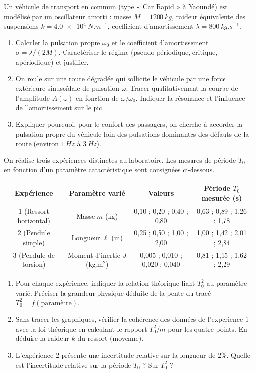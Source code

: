 \documentclass[11pt]{article}
\begin{document}
\begin{exercice}
Un véhicule de transport en commun (type « Car Rapid » à Yaoundé) est modélisé par un oscillateur amorti : masse $M = \SI{1200}{kg}$, raideur équivalente des suspensions $k = \SI{4.0e4}{N.m^{-1}}$, coefficient d'amortissement $\lambda = \SI{800}{kg.s^{-1}}$.
\begin{enumerate}
    \item Calculer la pulsation propre $\omega_0$ et le coefficient d'amortissement $\sigma = \lambda/(2M)$. Caractériser le régime (pseudo-périodique, critique, apériodique) et justifier.
    \item On roule sur une route dégradée qui sollicite le véhicule par une force extérieure sinusoïdale de pulsation $\omega$. Tracer qualitativement la courbe de l'amplitude $A(\omega)$ en fonction de $\omega/\omega_0$. Indiquer la résonance et l'influence de l'amortissement sur le pic.
    \item Expliquer pourquoi, pour le confort des passagers, on cherche à accorder la pulsation propre du véhicule loin des pulsations dominantes des défauts de la route (environ $\SI{1}{Hz}$ à $\SI{3}{Hz}$).
\end{enumerate}
\end{exercice}

\begin{exercice}
On réalise trois expériences distinctes au laboratoire. Les mesures de période $T_0$ en fonction d'un paramètre caractéristique sont consignées ci-dessous.
\begin{center}
\begin{tabular}{|c|c|c|c|}
\hline
\textbf{Expérience} & \textbf{Paramètre varié} & \textbf{Valeurs} & \textbf{Période $T_0$ mesurée (s)} \\
\hline
1 (Ressort horizontal) & Masse $m$ (kg) & 0,10 ; 0,20 ; 0,40 ; 0,80 & 0,63 ; 0,89 ; 1,26 ; 1,78 \\
\hline
2 (Pendule simple) & Longueur $\ell$ (m) & 0,25 ; 0,50 ; 1,00 ; 2,00 & 1,00 ; 1,42 ; 2,01 ; 2,84 \\
\hline
3 (Pendule de torsion) & Moment d'inertie $J$ (kg.m$^2$) & 0,005 ; 0,010 ; 0,020 ; 0,040 & 0,81 ; 1,15 ; 1,62 ; 2,29 \\
\hline
\end{tabular}
\end{center}
\begin{enumerate}
    \item Pour chaque expérience, indiquer la relation théorique liant $T_0^2$ au paramètre varié. Préciser la grandeur physique déduite de la pente du tracé $T_0^2 = f(\text{paramètre})$.
    \item Sans tracer les graphiques, vérifier la cohérence des données de l'expérience 1 avec la loi théorique en calculant le rapport $T_0^2/m$ pour les quatre points. En déduire la raideur $k$ du ressort (moyenne).
    \item L'expérience 2 présente une incertitude relative sur la longueur de $2\%$. Quelle est l'incertitude relative sur la période $T_0$ ? Sur $T_0^2$ ?
\end{enumerate}
\end{exercice}
\end{document}
